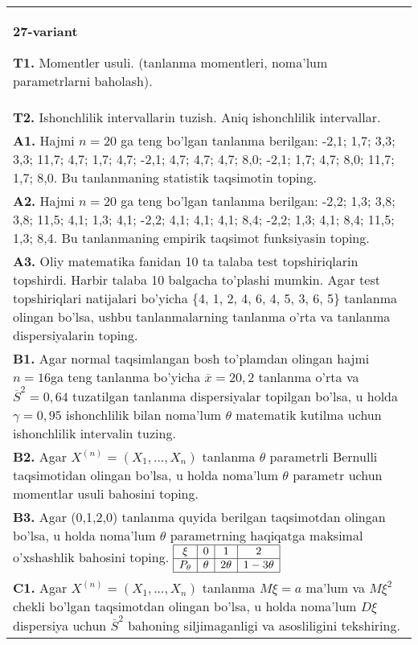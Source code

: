 \documentclass{article}
\begin{document}
\begin{tabular}{m{17cm}}
\textbf{27-variant}
\newline

\textbf{T1.} 
Momentler usuli. (tanlanma momentleri, noma'lum parametrlarni baholash).
\\
\textbf{T2.} 
Ishonchlilik intervallarin tuzish. Aniq ishonchlilik intervallar.
\\
\textbf{A1.} 
Hajmi \(n = 20\) ga teng bo'lgan tanlanma berilgan: -2,1; 1,7; 3,3; 3,3; 11,7; 4,7; 1,7; 4,7; -2,1; 4,7; 4,7; 4,7; 8,0; -2,1; 1,7; 4,7; 8,0; 11,7; 1,7; 8,0. Bu tanlanmaning statistik taqsimotin toping.
\\
\textbf{A2.} 
Hajmi \(n = 20\) ga teng bo'lgan tanlanma berilgan: -2,2; 1,3; 3,8; 3,8; 11,5; 4,1; 1,3; 4,1; -2,2; 4,1; 4,1; 4,1; 8,4; -2,2; 1,3; 4,1; 8,4; 11,5; 1,3; 8,4. Bu tanlanmaning empirik taqsimot funksiyasin toping.
\\
\textbf{A3.} 
Oliy matematika fanidan 10 ta talaba test topshiriqlarin topshirdi. Harbir talaba 10 balgacha to'plashi mumkin. Agar test topshiriqlari natijalari bo'yicha \{4, 1, 2, 4, 6, 4, 5, 3, 6, 5\} tanlanma olingan bo'lsa, ushbu tanlanmalarning tanlanma o'rta va tanlanma dispersiyalarin toping.
\\
\textbf{B1.} 
Agar normal taqsimlangan bosh to'plamdan olingan hajmi \(n = 16\)ga teng tanlanma bo'yicha \(\overline{x} = 20,2\) tanlanma o'rta va \({\overline{S}}^{2} = 0,64\) tuzatilgan tanlanma dispersiyalar topilgan bo'lsa, u holda \(\gamma = 0,95\) ishonchlilik bilan noma'lum \(\theta\) matematik kutilma uchun ishonchlilik intervalin tuzing.
\\
\textbf{B2.} 
Agar \(X^{(n)} = \left( X_{1},...,X_{n} \right)\) tanlanma \(\theta\) parametrli Bernulli taqsimotidan olingan bo'lsa, u holda noma'lum \(\theta\) parametr uchun momentlar usuli bahosini toping.
\\
\textbf{B3.} 
Agar (0,1,2,0) tanlanma quyida berilgan taqsimotdan olingan bo'lsa, u holda noma'lum \(\theta\) parametrning haqiqatga maksimal o'xshashlik bahosini toping.
$\begin{array}{|c|c|c|c|}
    \hline
    \xi & 0 & 1 & 2 \\
    \hline
    P_{\theta} & \theta & 2\theta & 1 - 3\theta \\
    \hline
\end{array}$
\\
\textbf{C1.} 
Agar \(X^{(n)} = \left( X_{1},...,X_{n} \right)\) tanlanma \(M\xi = a\) ma'lum va \(M\xi^{2}\) chekli bo'lgan taqsimotdan olingan bo'lsa, u holda noma'lum \(D\xi\) dispersiya uchun \({\overline{S}}^{2}\) bahoning siljimaganligi va asosliligini tekshiring.

\end{tabular}
\end{document}
